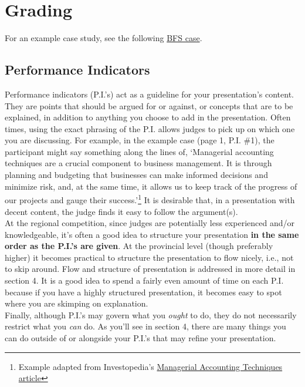 \documentclass[12pt]{article}
\begin{document}
\section{Grading}

For an example case study, see the following \href{https://www.deca.org/wp-content/uploads/2014/08/HS_BFS_Web_Sample.pdf}{BFS case}. 

\subsection{Performance Indicators}

	Performance indicators (P.I.'s) act as a guideline for your presentation's content. They are points that  should be argued for or against, or concepts that are to be explained, in addition to anything you choose to add in the presentation. Often times, using the exact phrasing of the P.I. allows judges to pick up on which one you are discussing. For example, in the example case (page 1, P.I. \#1), the participant might say something along the lines of, \lq  Managerial accounting techniques are a crucial component to business management. It is through planning and budgeting that businesses can make informed decisions and minimize risk, and, at the same time, it allows us to keep track of the progress of our projects and gauge their success.'\footnote{Example adapted from Investopedia's \href{http://www.investopedia.com/ask/answers/062915/what-are-common-concepts-and-techniques-managerial-accounting.asp}{Managerial Accounting Techniques article}} It is desirable that, in a presentation with decent content, the judge finds it easy to follow the argument(s). \\

	At the regional competition, since judges are potentially less experienced and/or knowledgeable, it's often a good idea to structure your presentation \textbf{in the same order as the P.I.'s are given}. At the provincial level (though preferably higher) it  becomes practical to structure the presentation to flow nicely, i.e., not to skip around. Flow and structure of presentation is addressed in more detail in section 4. It is a good idea to spend a fairly even amount of time on each P.I. because if you have a highly structured presentation, it becomes easy to spot where you are skimping on explanation. \\
	
	Finally, although P.I.'s may govern what you \textit{ought} to do, they do not necessarily restrict what you \textit{can} do. As you'll see in section 4, there are many things you can do outside of or alongside your P.I.'s that may refine your presentation.
	
\end{document}
